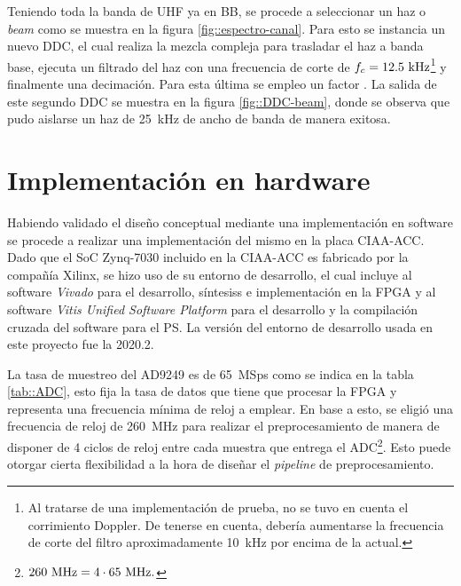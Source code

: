 \documentclass[../../main.tex]{subfiles}
\begin{document}
Teniendo toda la banda de UHF ya en BB, se procede a seleccionar un haz o \textit{beam} como se muestra en la figura \ref{fig::espectro-canal}. 
Para esto se instancia un nuevo DDC, el cual realiza la mezcla compleja para trasladar el haz a banda base, ejecuta un filtrado del haz con una frecuencia de corte de $f_c = 12.5~\textrm{kHz}$\footnote{Al tratarse de una implementación de prueba, no se tuvo en cuenta el corrimiento Doppler. 
De tenerse en cuenta, debería aumentarse la frecuencia de corte del filtro aproximadamente 10~kHz por encima de la actual.} y finalmente una decimación. 
Para esta última se empleo un factor . La salida de este segundo DDC se muestra en la figura \ref{fig::DDC-beam}, donde se observa que pudo aislarse un haz de 25~kHz de ancho de banda de manera exitosa.




\section{Implementación en hardware}
Habiendo validado el diseño conceptual mediante una implementación en software se procede a realizar una implementación del mismo en la placa CIAA-ACC. Dado que el SoC Zynq-7030 incluido en la CIAA-ACC es fabricado por la compañía Xilinx, se hizo uso de su entorno de desarrollo, el cual incluye al software \textit{Vivado} \cite{vivado} para el desarrollo, síntesiss e implementación en la FPGA y al software \textit{Vitis Unified Software Platform} \cite{vitis} para el desarrollo y la compilación cruzada \cite{cross-compilation} del software para el PS. La versión del entorno de desarrollo usada en este proyecto fue la 2020.2.

La tasa de muestreo del AD9249 es de 65~MSps como se indica en la tabla \ref{tab::ADC}, esto fija la tasa de datos que tiene que procesar la FPGA y representa una frecuencia mínima de reloj a emplear. En base a esto, se eligió una frecuencia de reloj de 260~MHz para realizar el preprocesamiento de manera de disponer de 4 ciclos de reloj entre cada muestra que entrega el ADC\footnote{$260~\textrm{MHz} = 4 \cdot 65~\textrm{MHz}.$}. Esto puede otorgar cierta flexibilidad a la hora de diseñar el \textit{pipeline} de preprocesamiento.
\end{document}
